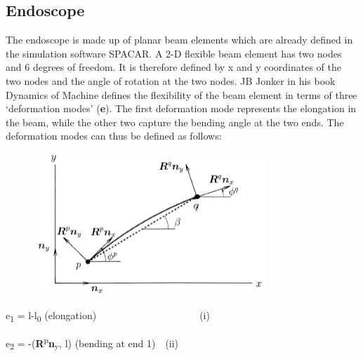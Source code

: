 \documentclass[12pt]{report}
\begin{document}
\subsection*{Endoscope}
The endoscope is made up of planar beam elements which are already defined in the simulation software SPACAR. A 2-D flexible beam element has two nodes and 6 degrees of freedom. It is therefore defined by x and y coordinates of the two nodes and the angle of rotation at the two nodes. JB Jonker in his book Dynamics of Machine\cite{JBJ09} defines the flexibility of the beam element in terms of three ‘deformation modes’ (\textbf{e}). The first deformation mode represents the elongation in the beam, while the other two capture the bending angle at the two ends. The deformation modes can thus be defined as follows:\par


\vspace{\baselineskip}



\begin{figure}[H]
	\begin{FlushLeft}		\includegraphics[width=3.45in,height=2.12in]{./media/image6.png}
	\end{FlushLeft}\end{figure}



\begin{FlushLeft}
e\textsubscript{1} = l-l\textsubscript{0} (elongation)\ \  \ \ \ \ \ \ \ \ \ \ \ \ \ \ \ \ \ \ \  (i)
\end{FlushLeft}\par

\begin{FlushLeft}
e\textsubscript{2} = -(\textbf{R}\textsuperscript{p}\textbf{n}\textsubscript{y}, l) (bending at end 1)\ \  (ii)
\end{FlushLeft}\par
\end{document}
